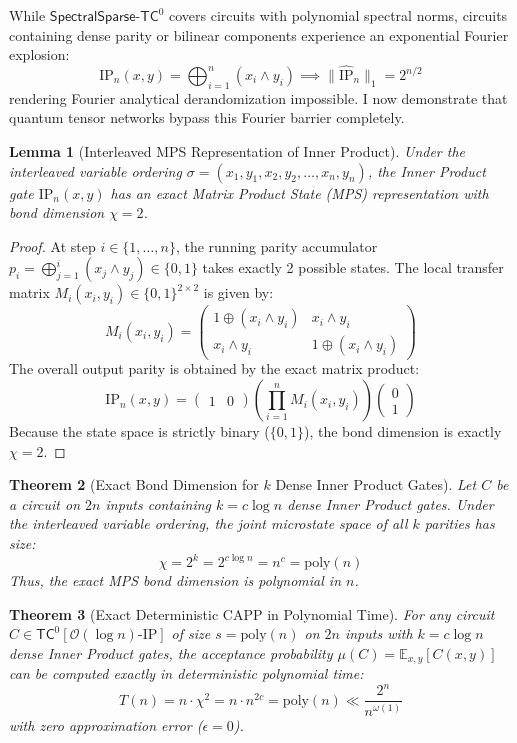 \documentclass[11pt,a4paper]{article}
\newtheorem{theorem}{Theorem}[section]
\newtheorem{lemma}[theorem]{Lemma}
\theoremstyle{definition}
\theoremstyle{remark}
\newcommand{\TC}{\mathsf{TC}}
\newcommand{\poly}{\mathrm{poly}}
\newcommand{\E}{\mathbb{E}}
\newcommand{\SparseTC}{\mathsf{SpectralSparse}\text{-}\mathsf{TC}^0}
\newcommand{\IP}{\mathrm{IP}}
\begin{document}
While $\SparseTC$ covers circuits with polynomial spectral norms, circuits containing dense parity or bilinear components experience an exponential Fourier explosion:
\[
\IP_n(x, y) = \bigoplus_{i=1}^n (x_i \land y_i) \implies \|\widehat{\IP}_n\|_1 = 2^{n/2}
\]
rendering Fourier analytical derandomization impossible. I now demonstrate that quantum tensor networks bypass this Fourier barrier completely.

\begin{lemma}[Interleaved MPS Representation of Inner Product]\label{lem:ip_mps}
Under the interleaved variable ordering $\sigma = (x_1, y_1, x_2, y_2, \dots, x_n, y_n)$, the Inner Product gate $\IP_n(x, y)$ has an exact Matrix Product State (MPS) representation with bond dimension $\chi = 2$.
\end{lemma}

\begin{proof}
At step $i \in \{1, \dots, n\}$, the running parity accumulator $p_i = \bigoplus_{j=1}^i (x_j \land y_j) \in \{0, 1\}$ takes exactly 2 possible states. The local transfer matrix $M_i(x_i, y_i) \in \{0,1\}^{2 \times 2}$ is given by:
\[
M_i(x_i, y_i) = \begin{pmatrix} 1 \oplus (x_i \land y_i) & x_i \land y_i \\ x_i \land y_i & 1 \oplus (x_i \land y_i) \end{pmatrix}
\]
The overall output parity is obtained by the exact matrix product:
\[
\IP_n(x, y) = \begin{pmatrix} 1 & 0 \end{pmatrix} \left( \prod_{i=1}^n M_i(x_i, y_i) \right) \begin{pmatrix} 0 \\ 1 \end{pmatrix}
\]
Because the state space is strictly binary ($\{0, 1\}$), the bond dimension is exactly $\chi = 2$.
\end{proof}

\begin{theorem}[Exact Bond Dimension for $k$ Dense Inner Product Gates]\label{thm:k_ip_mps}
Let $C$ be a circuit on $2n$ inputs containing $k = c \log n$ dense Inner Product gates. Under the interleaved variable ordering, the joint microstate space of all $k$ parities has size:
\[
\chi = 2^k = 2^{c \log n} = n^c = \poly(n)
\]
Thus, the exact MPS bond dimension is polynomial in $n$.
\end{theorem}

\begin{theorem}[Exact Deterministic CAPP in Polynomial Time]\label{thm:exact_capp}
For any circuit $C \in \TC^0[\mathcal{O}(\log n)\text{-}\mathrm{IP}]$ of size $s = \poly(n)$ on $2n$ inputs with $k = c \log n$ dense Inner Product gates, the acceptance probability $\mu(C) = \E_{x, y}[C(x, y)]$ can be computed \emph{exactly} in deterministic polynomial time:
\[
T(n) = n \cdot \chi^2 = n \cdot n^{2c} = \poly(n) \ll \frac{2^n}{n^{\omega(1)}}
\]
with zero approximation error ($\epsilon = 0$).
\end{theorem}
\end{document}
